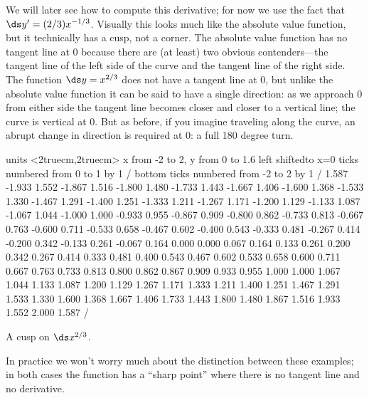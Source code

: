 \begin{solution} 
We will later see how to compute this
derivative; for now we use the fact that $\ds
y'=(2/3)x^{-1/3}$. Visually this looks much like the absolute value
function, but it technically has a cusp, not a corner. The absolute
value function has no tangent line at 0 because there are (at least)
two obvious contenders---the tangent line of the left side of the
curve and the tangent line of the right side.
The function $\ds y=x^{2/3}$ does not have a tangent line at 0, but
unlike the absolute value function it can be said to have a single
direction: as we approach 0 from either side the tangent line becomes
closer and closer to a vertical line; the curve is vertical at 0. But
as before, if you imagine traveling along the curve, an abrupt change
in direction is required at 0: a full 180 degree turn.  
\end{solution}

\figure
\centerline{\vbox{\beginpicture
\normalgraphs
\setcoordinatesystem units <2truecm,2truecm>
\setplotarea x from -2 to 2, y from 0 to 1.6
\axis left shiftedto x=0 ticks numbered from 0 to 1 by 1 /
\axis bottom ticks numbered from -2 to 2 by 1 /
\setquadratic
{} 1.587 -1.933 1.552 -1.867 1.516 -1.800 1.480 -1.733 1.443 
-1.667 1.406 -1.600 1.368 -1.533 1.330 -1.467 1.291 -1.400 1.251 
-1.333 1.211 -1.267 1.171 -1.200 1.129 -1.133 1.087 -1.067 1.044 
-1.000 1.000 -0.933 0.955 -0.867 0.909 -0.800 0.862 -0.733 0.813 
-0.667 0.763 -0.600 0.711 -0.533 0.658 -0.467 0.602 -0.400 0.543 
-0.333 0.481 -0.267 0.414 -0.200 0.342 -0.133 0.261 -0.067 0.164 
0.000 0.000 0.067 0.164 0.133 0.261 0.200 0.342 0.267 0.414 
0.333 0.481 0.400 0.543 0.467 0.602 0.533 0.658 0.600 0.711 
0.667 0.763 0.733 0.813 0.800 0.862 0.867 0.909 0.933 0.955 
1.000 1.000 1.067 1.044 1.133 1.087 1.200 1.129 1.267 1.171 
1.333 1.211 1.400 1.251 1.467 1.291 1.533 1.330 1.600 1.368 
1.667 1.406 1.733 1.443 1.800 1.480 1.867 1.516 1.933 1.552 
2.000 1.587   /
\endpicture}}
\caption{A cusp on $\ds x^{2/3}$. \label{fig:cusp}}
\endfigure

In practice we won't worry much about the distinction between these
examples; in both cases the function has a ``sharp point'' where there
is no tangent line and no derivative.